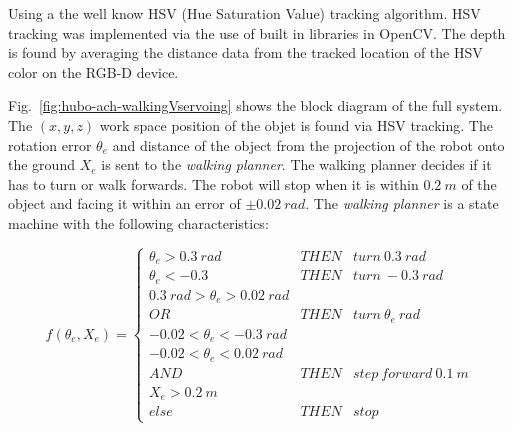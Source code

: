 




Using a the well know HSV (Hue Saturation Value) tracking algorithm.  
HSV tracking was implemented via the use of built in libraries in OpenCV\cite{opencv}.
The depth is found by averaging the distance data from the tracked location of the HSV color on the RGB-D device.

Fig.~\ref{fig:hubo-ach-walkingVservoing} shows the block diagram of the full system. 
The $(x,y,z)$ work space position of the objet is found via HSV tracking.  
The rotation error $\theta_e$ and distance of the object from the projection of the robot onto the ground $X_e$ is sent to the \textit{walking planner}.  
The walking planner decides if it has to turn or walk forwards. 
The robot will stop when it is within $0.2~m$ of the object and facing it within an error of $\pm 0.02~rad$.
The \textit{walking planner} is a state machine with the following characteristics:

\begin{equation}
f(\theta_e,X_e) = \left\{
     \begin{array}{ccl}
       \theta_e > 0.3~rad  & THEN & turn~0.3~rad\\
       \hline
       \theta_e < -0.3 & THEN & turn~-0.3~rad\\
       \hline
       0.3~rad > \theta_e > 0.02~rad && \\
       OR & THEN & turn~\theta_e~rad\\ 
       -0.02 < \theta_e < -0.3~rad & & \\
       \hline
        -0.02 < \theta_e < 0.02~rad &  &\\
        AND & THEN & step~forward~0.1~m\\
         X_e > 0.2~m &  &  \\
         \hline
        else & THEN & stop
     \end{array}
   \right.
\end{equation}



